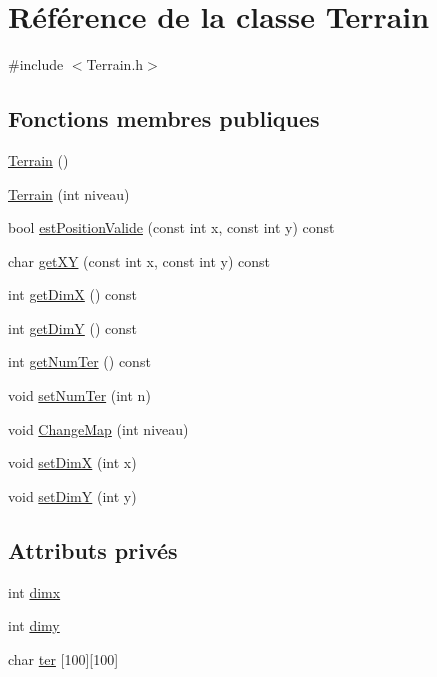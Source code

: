 \hypertarget{class_terrain}{}\section{Référence de la classe Terrain}
\label{class_terrain}


{\ttfamily \#include $<$Terrain.\+h$>$}

\subsection*{Fonctions membres publiques}
\begin{DoxyCompactItemize}
\item 
\hyperlink{class_terrain_a7160a06ab07a86ed97d23374405e8ef6}{Terrain} ()
\item 
\hyperlink{class_terrain_a986a374fb1ab7cbe52b3ba68934bae8c}{Terrain} (int niveau)
\item 
bool \hyperlink{class_terrain_a939a702645ade7ce599f55c1b760cb26}{est\+Position\+Valide} (const int x, const int y) const
\item 
char \hyperlink{class_terrain_a60a33d464cfb8468e26f1b4dee525178}{get\+XY} (const int x, const int y) const
\item 
int \hyperlink{class_terrain_accb6cc4ab37641b10d6d0cc3c2d9b0cb}{get\+DimX} () const
\item 
int \hyperlink{class_terrain_a60bc76d822c15ca30576bd747d156b48}{get\+DimY} () const
\item 
int \hyperlink{class_terrain_a4e44d60542cfb60119468af5d24b69cd}{get\+Num\+Ter} () const
\item 
void \hyperlink{class_terrain_a8982e144bbc068fb1904092edf327d75}{set\+Num\+Ter} (int n)
\item 
void \hyperlink{class_terrain_a52c2a50f1df6a2b67dc411a5ae76ae68}{Change\+Map} (int niveau)
\item 
void \hyperlink{class_terrain_a97e790dd5379c05db3515d90b2f54b02}{set\+DimX} (int x)
\item 
void \hyperlink{class_terrain_a4fad5f05f2d96ca8ad0cb6442c218df4}{set\+DimY} (int y)
\end{DoxyCompactItemize}
\subsection*{Attributs privés}
\begin{DoxyCompactItemize}
\item 
int \hyperlink{class_terrain_a3daf4955d95ede05eca8addab03445cd}{dimx}
\item 
int \hyperlink{class_terrain_a8ffa11e67f45e16389333431fab2110f}{dimy}
\item 
char \hyperlink{class_terrain_a52f0fcf1c339c1c5ac1fb9b3146b8d75}{ter} \mbox{[}100\mbox{]}\mbox{[}100\mbox{]}
\end{DoxyCompactItemize}



